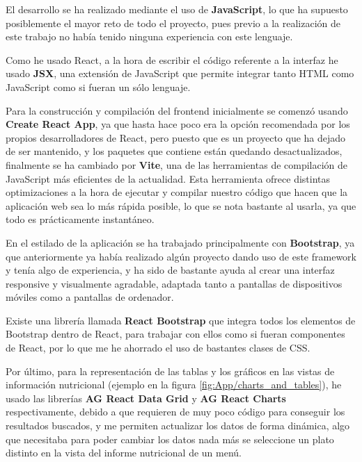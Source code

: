 
El desarrollo se ha realizado mediante el uso de \textbf{JavaScript}, lo que ha supuesto posiblemente el mayor reto de todo el proyecto, pues previo a la realización de este trabajo no había tenido ninguna experiencia con este lenguaje.

Como he usado React, a la hora de escribir el código referente a la interfaz he usado \textbf{JSX}, una extensión de JavaScript que permite integrar tanto HTML como JavaScript como si fueran un sólo lenguaje.

Para la construcción y compilación del frontend inicialmente se comenzó usando \textbf{Create React App}, ya que hasta hace poco era la opción recomendada por los propios desarrolladores de React, pero puesto que es un proyecto que ha dejado de ser mantenido, y los paquetes que contiene están quedando desactualizados, finalmente se ha cambiado por \textbf{Vite}, una de las herramientas de compilación de JavaScript más eficientes de la actualidad. Esta herramienta ofrece distintas optimizaciones a la hora de ejecutar y compilar nuestro código que hacen que la aplicación web sea lo más rápida posible, lo que se nota bastante al usarla, ya que todo es prácticamente instantáneo.

En el estilado de la aplicación se ha trabajado principalmente con \textbf{Bootstrap}, ya que anteriormente ya había realizado algún proyecto dando uso de este framework y tenía algo de experiencia, y ha sido de bastante ayuda al crear una interfaz responsive y visualmente agradable, adaptada tanto a pantallas de dispositivos móviles como a pantallas de ordenador. 

Existe una librería llamada \textbf{React Bootstrap} que integra todos los elementos de Bootstrap dentro de React, para trabajar con ellos como si fueran componentes de React, por lo que me he ahorrado el uso de bastantes clases de CSS.

Por último, para la representación de las tablas y los gráficos en las vistas de información nutricional (ejemplo en la figura \ref{fig:App/charts_and_tables}), he usado las librerías \textbf{AG React Data Grid} y \textbf{AG React Charts} respectivamente, debido a que requieren de muy poco código para conseguir los resultados buscados, y me permiten actualizar los datos de forma dinámica, algo que necesitaba para poder cambiar los datos nada más se seleccione un plato distinto en la vista del informe nutricional de un menú.

